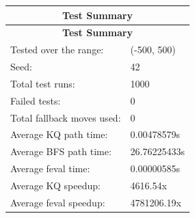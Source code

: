 \documentclass[a4paper, 12pt]{article}
\begin{document}
\vspace{1em}
\renewcommand{\arraystretch}{1.5} %

\begin{longtable}{|l|l|}
    \hline
    \multicolumn{2}{|c|}{\textbf{Test Summary}} \\ %
    \hline
    \endfirsthead
    \hline
    \multicolumn{2}{|c|}{\textbf{Test Summary}} \\ %
    \hline
    \endhead
    \hline
    \endfoot
    \hline
    \endlastfoot
    Tested over the range: & (-500, 500) \\
    Seed: & 42 \\
    Total test runs: & 1000 \\
    Failed tests: & 0 \\
    Total fallback moves used: & 0 \\
    Average KQ path time: & 0.00478579s \\
    Average BFS path time: & 26.76225433s \\
    Average feval time: & 0.00000585s \\
    Average KQ speedup: & 4616.54x \\
    Average feval speedup: & 4781206.19x \\
\end{longtable}

\end{document}

